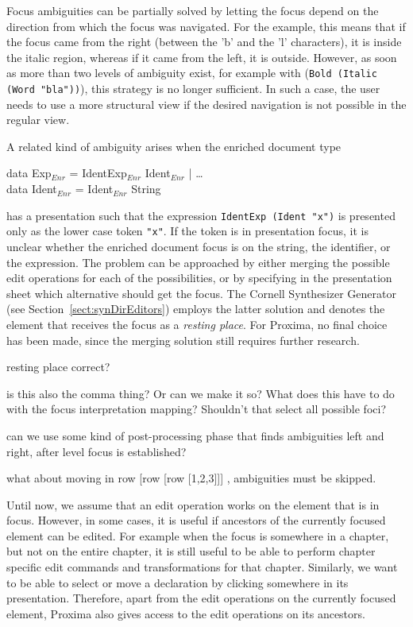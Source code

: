 Focus ambiguities can be partially solved by letting the focus depend on the direction from which the focus was navigated. For the example, this means that if the focus came from the right (between the 'b' and the 'l' characters), it is inside the italic region, whereas if it came from the left, it is outside. However, as soon as more than two levels of ambiguity exist, for example with (\verb|Bold (Italic (Word "bla"))|), this strategy is no longer sufficient. In such a case, the user needs to use a more structural view if the desired navigation is not possible in the regular view.


A related kind of ambiguity arises when the enriched document type

\small \ttfamily
\begin{tabbing}
data Exp$_{Enr}$ = IdentExp$_{Enr}$ Ident$_{Enr}$ | \dots \\
data Ident$_{Enr}$ = Ident$_{Enr}$ String
\end{tabbing}
\rmfamily \normalsize

has a presentation such that the expression \verb|IdentExp (Ident "x")| is presented only as the lower case token \verb|"x"|. If the token is in presentation focus, it is unclear whether the enriched document focus is on the string, the identifier, or the expression. The problem can be approached by either merging the possible edit operations for each of the possibilities, or by specifying in the presentation sheet which alternative should get the focus. The Cornell Synthesizer Generator (see Section~\ref{sect:synDirEditors}) employs the latter solution and denotes the element that receives the focus as a {\em resting place}. For Proxima, no final choice has been made, since the merging solution still requires further research.

\bc
resting place correct?

is this also the comma thing? Or can we make it so?
What does this have to do with the focus interpretation mapping? Shouldn't that select all possible foci?

can we use some kind of post-processing phase that finds ambiguities left and right, after level focus is established?

what about moving in row [row [row [1,2,3]]] , ambiguities must be skipped. 
\ec

Until now, we assume that an edit operation works on the element that is in focus. However, in some cases, it is useful if ancestors of the currently focused element can be edited. For example when the focus is somewhere in a chapter, but not on the entire chapter, it is still useful to be able to perform chapter specific edit commands and transformations for that chapter. Similarly, we want to be able to select or move a declaration by clicking somewhere in its presentation. Therefore, apart from the edit operations on the currently focused element, Proxima also gives access to the edit operations on its ancestors. 


